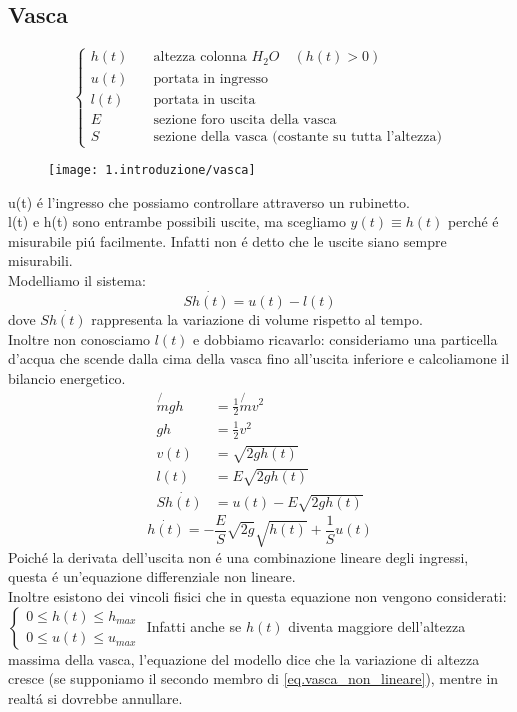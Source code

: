 \documentclass[../main.tex]{subfiles}
\begin{document}
	\subsection{Vasca}
		\[
			\begin{cases}
				h(t) & \quad \text{altezza colonna $H_{2}O$} \quad (h(t)>0)\\
				u(t) & \quad \text{portata in ingresso}\\
				l(t) & \quad \text{portata in uscita}\\
				E & \quad \text{sezione foro uscita della vasca}\\
				S & \quad \text{sezione della vasca (costante su tutta l'altezza)}
			\end{cases}
		\]
		\begin{figure}[h!]
			\centering
			\texttt{[image: 1.introduzione/vasca]}
		\end{figure}
		u(t) \'e l'ingresso che possiamo controllare attraverso un rubinetto.\\
		l(t) e h(t) sono entrambe possibili uscite, ma scegliamo $y(t) \equiv h(t)$ perch\'e \'e misurabile pi\'u facilmente. Infatti non \'e detto che le uscite siano sempre misurabili.\\
		Modelliamo il sistema:
		\begin{equation}
			S \dot{h(t)} = u(t) - l(t)
		\end{equation}
		dove $S \dot{h(t)}$ rappresenta la variazione di volume rispetto al tempo.\\
		Inoltre non conosciamo $l(t)$ e dobbiamo ricavarlo: consideriamo una particella d'acqua che scende dalla cima della vasca fino all'uscita inferiore e calcoliamone il bilancio energetico.
		\begin{align*}
			\not{m} gh &= \frac{1}{2} \not{m} v^2\\
			gh &= \frac{1}{2} v^2\\
			v(t) &= \sqrt{2gh(t)}\\
			l(t) &= E \sqrt{2gh(t)}\\
			S \dot{h(t)} &= u(t) - E \sqrt{2gh(t)}
		\end{align*}
		\begin{equation} \label{eq.vasca_non_lineare}
			\dot{h(t)} = - \frac{E}{S} \sqrt{2g} \sqrt{h(t)} + \frac{1}{S} u(t)
		\end{equation}
		Poiché la derivata dell'uscita non \'e una combinazione lineare degli ingressi, questa \'e un'equazione differenziale non lineare.\\
		Inoltre esistono dei vincoli fisici che in questa equazione non vengono considerati: 
		\(
			\begin{cases}
				0 \leq h(t) \leq h_{max}\\
				0 \leq u(t) \leq u_{max}
			\end{cases}
		\)
		Infatti anche se $h(t)$ diventa maggiore dell'altezza massima della vasca, l'equazione del modello dice che la variazione di altezza cresce (se supponiamo il secondo membro di \ref{eq.vasca_non_lineare}), mentre in realt\'a si dovrebbe annullare.
		
\end{document}
